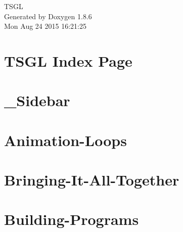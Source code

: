 \documentclass[twoside]{book}
\newcommand{\clearemptydoublepage}{%
  \newpage{\pagestyle{empty}\cleardoublepage}%
}
\begin{document}
\hypersetup{pageanchor=false}
\begin{titlepage}
\vspace*{7cm}
\begin{center}%
{\Large T\-S\-G\-L }\\
\vspace*{1cm}
{\large Generated by Doxygen 1.8.6}\\
\vspace*{0.5cm}
{\small Mon Aug 24 2015 16:21:25}\\
\end{center}
\end{titlepage}
\clearemptydoublepage
\tableofcontents
\clearemptydoublepage
{}
\hypersetup{pageanchor=true}

\chapter{T\-S\-G\-L Index Page}
\label{index}\hypertarget{index}{}
\chapter{\-\_\-\-Sidebar}
\label{md__home_kodemonkey__desktop__t_s_g_l_docs-wiki___sidebar}
\hypertarget{md__home_kodemonkey__desktop__t_s_g_l_docs-wiki___sidebar}{}

\chapter{Animation-\/\-Loops}
\label{md__home_kodemonkey__desktop__t_s_g_l_docs-wiki__animation-_loops}
\hypertarget{md__home_kodemonkey__desktop__t_s_g_l_docs-wiki__animation-_loops}{}

\chapter{Bringing-\/\-It-\/\-All-\/\-Together}
\label{md__home_kodemonkey__desktop__t_s_g_l_docs-wiki__bringing-_it-_all-_together}
\hypertarget{md__home_kodemonkey__desktop__t_s_g_l_docs-wiki__bringing-_it-_all-_together}{}

\chapter{Building-\/\-Programs}
\label{md__home_kodemonkey__desktop__t_s_g_l_docs-wiki__building-_programs}
\hypertarget{md__home_kodemonkey__desktop__t_s_g_l_docs-wiki__building-_programs}{}

\end{document}
